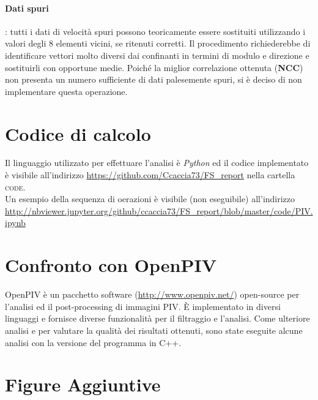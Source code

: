\documentclass[a4paper]{article}
\begin{document}
\paragraph{Dati spuri}: tutti i dati di velocità spuri possono teoricamente essere sostituiti utilizzando i valori degli 8 elementi vicini, se ritenuti corretti. Il procedimento richiederebbe di identificare vettori molto diversi dai confinanti in termini di modulo e direzione e sostituirli con opportune medie. Poiché la miglior correlazione ottenuta (\textbf{NCC}) non presenta un numero sufficiente di dati palesemente spuri, si è deciso di non implementare questa operazione.

\section{Codice di calcolo}

Il linguaggio utilizzato per effettuare l'analisi è \textit{Python} ed il codice implementato è visibile all'indirizzo \url{https://github.com/Ccaccia73/FS_report} nella cartella \textsc{code}.\\
Un esempio della sequenza di oerazioni è visibile (non eseguibile) all'indirizzo \url{http://nbviewer.jupyter.org/github/ccaccia73/FS_report/blob/master/code/PIV.ipynb}


\newpage

\section{Confronto con OpenPIV}

OpenPIV è un pacchetto software (\url{http://www.openpiv.net/}) open-source per l'analisi ed il post-processing di immagini PIV. \`{E} implementato in diversi linguaggi e fornisce diverse funzionalità per il filtraggio e l'analisi. Come ulteriore analisi e per valutare la qualità dei risultati ottenuti, sono state eseguite alcune analisi con la versione del programma in \textsc{C++}.  









\newpage


\section{Figure Aggiuntive}
\end{document}

